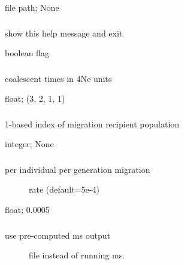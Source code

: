 \documentclass[letterpaper,12pt,english]{sphinxmanual}
\begin{document}
 file path;  None


\subsubsection{}
\label{\detokenize{prog_desc:id6}}
 show this help message and exit

 boolean flag


\subsubsection{}
\label{\detokenize{prog_desc:coaltimes}}
 coalescent times in 4Ne units

 float;  (3, 2, 1, 1)


\subsubsection{}
\label{\detokenize{prog_desc:mdest}}
 1-based index of migration recipient population

 integer;  None


\subsubsection{}
\label{\detokenize{prog_desc:mrate}}\begin{description}
\item[{ per individual per generation migration}] \leavevmode
rate (default=5e-4)

\end{description}

 float;  0.0005


\subsubsection{}
\label{\detokenize{prog_desc:msfile}}\begin{description}
\item[{ use pre-computed ms output}] \leavevmode
file instead of running ms.

\end{description}
\end{document}
